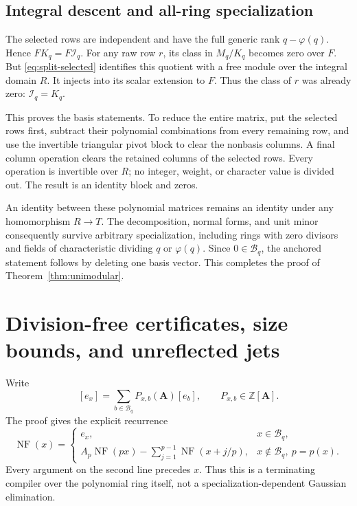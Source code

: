 \documentclass[11pt]{article}
\numberwithin{equation}{section}
\theoremstyle{definition}
\theoremstyle{remark}
\DeclareMathOperator{\NF}{NF}
\newcommand{\Z}{\mathbb Z}
\newcommand{\I}{\mathcal I}
\newcommand{\B}{\mathcal B}
\begin{document}
\subsection{Integral descent and all-ring specialization}
The selected rows are independent and have the full generic rank
$q-\varphi(q)$. Hence $F K_q=F\I_q$. For any raw row $r$, its class in
$M_q/K_q$ becomes zero over $F$. But \eqref{eq:split-selected} identifies
this quotient with a free module over the integral domain $R$.
It injects into its scalar extension to $F$. Thus the class of $r$ was
already zero: $\I_q=K_q$.

This proves the basis statements. To reduce the entire matrix, put the
selected rows first, subtract their polynomial combinations from every
remaining row, and use the invertible triangular pivot block to clear
the nonbasis columns. A final column operation clears the retained
columns of the selected rows. Every operation is invertible over $R$;
no integer, weight, or character value is divided out. The result is
an identity block and zeros.

An identity between these polynomial matrices remains an identity under
any homomorphism $R\to T$. The decomposition, normal forms, and unit
minor consequently survive arbitrary specialization, including rings
with zero divisors and fields of characteristic dividing $q$ or
$\varphi(q)$. Since $0\in\B_q$, the anchored statement follows by
deleting one basis vector. This completes the proof of
Theorem~\ref{thm:unimodular}.

\section{Division-free certificates, size bounds, and unreflected jets}
\label{sec:compiler}
Write
\[
 [e_x]=\sum_{b\in\B_q}P_{x,b}(\boldsymbol A)[e_b],\qquad
 P_{x,b}\in\Z[\boldsymbol A].
\]
The proof gives the explicit recurrence
\begin{equation}
 \NF(x)=\begin{cases}
 e_x,&x\in\B_q,\\[2pt]
 A_p\NF(px)-\displaystyle\sum_{j=1}^{p-1}\NF(x+j/p),
   &x\notin\B_q,\ p=p(x).
 \end{cases}
 \label{eq:recurrence}
\end{equation}
Every argument on the second line precedes $x$. Thus this is a terminating
compiler over the polynomial ring itself, not a specialization-dependent
Gaussian elimination.
\end{document}
